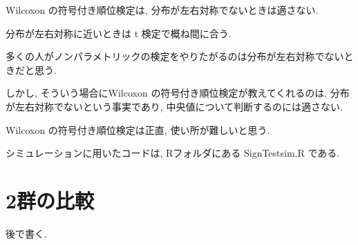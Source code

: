 \documentclass[12pt]{jsarticle}
\begin{document}
Wilcoxon の符号付き順位検定は, 分布が左右対称でないときは適さない. 

分布が左右対称に近いときは t 検定で概ね間に合う. 

多くの人がノンパラメトリックの検定をやりたがるのは分布が左右対称でないときだと思う.

しかし, そういう場合にWilcoxon の符号付き順位検定が教えてくれるのは, 分布が左右対称でないという事実であり, 中央値について判断するのには適さない.

 Wilcoxon の符号付き順位検定は正直, 使い所が難しいと思う.
 
 シミュレーションに用いたコードは, Rフォルダにある SignTestsim.R である.
 
 \section{2群の比較}
 後で書く.
\end{document}
